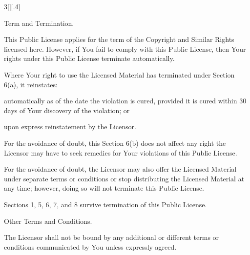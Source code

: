 \documentclass[8pt,cleardoubleempty]{scrbook}
\begin{document}
\begin{multicols}{3}[][.4\paperwidth]
\begin{longenum}
\begin{longenum}
  \end{longenum}


 \item Term and Termination.

  \begin{longenum}

  \item This Public License applies for the term of the Copyright and
     Similar Rights licensed here. However, if You fail to comply with
     this Public License, then Your rights under this Public License
     terminate automatically.

  \item Where Your right to use the Licensed Material has terminated under
     Section 6(a), it reinstates:

       \begin{longenum}

       \item automatically as of the date the violation is cured, provided
          it is cured within 30 days of Your discovery of the
          violation; or

       \item upon express reinstatement by the Licensor.

       \end{longenum}

     For the avoidance of doubt, this Section 6(b) does not affect any
     right the Licensor may have to seek remedies for Your violations
     of this Public License.

  \item For the avoidance of doubt, the Licensor may also offer the
     Licensed Material under separate terms or conditions or stop
     distributing the Licensed Material at any time; however, doing so
     will not terminate this Public License.

  \item Sections 1, 5, 6, 7, and 8 survive termination of this Public
     License.

  \end{longenum}

 \item Other Terms and Conditions.

  \begin{longenum}

  \item The Licensor shall not be bound by any additional or different
     terms or conditions communicated by You unless expressly agreed.


\end{longenum}
\end{longenum}
\end{multicols}
\end{document}
